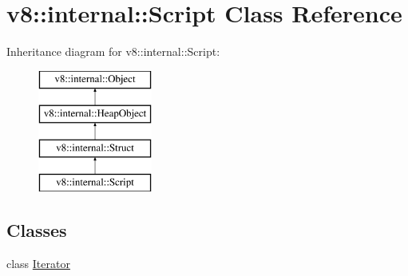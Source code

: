 \hypertarget{classv8_1_1internal_1_1_script}{}\section{v8\+:\+:internal\+:\+:Script Class Reference}
\label{classv8_1_1internal_1_1_script}
Inheritance diagram for v8\+:\+:internal\+:\+:Script\+:\begin{figure}[H]
\begin{center}
\leavevmode
\includegraphics[height=4.000000cm]{classv8_1_1internal_1_1_script}
\end{center}
\end{figure}
\subsection*{Classes}
\begin{DoxyCompactItemize}
\item 
class \hyperlink{classv8_1_1internal_1_1_script_1_1_iterator}{Iterator}
\end{DoxyCompactItemize}
